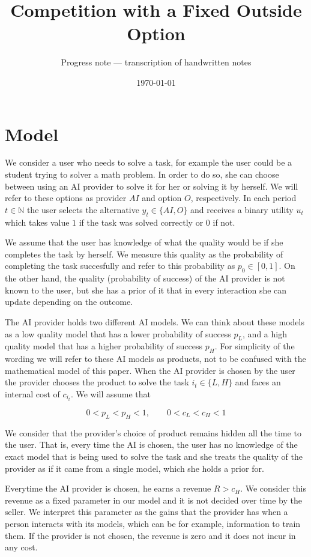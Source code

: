 \documentclass[11pt]{article}
\title{Competition with a Fixed Outside Option}
\author{Progress note --- transcription of handwritten notes}
\date{\today}
\begin{document}
\section{Model}
We consider a user who needs to solve a task, for example the user could be a student trying to solver a math problem. In order to do so, she can choose between using an AI provider to solve it for her or solving it by herself. We will refer to these options as provider $AI$ and option $O$, respectively. In each period $t \in \mathbb{N}$ the user selects the alternative $y_t \in \{AI, O\}$ and receives a binary utility $u_t$ which takes value $1$ if the task was solved correctly or $0$ if not. 

We assume that the user has knowledge of what the quality would be if she completes the task by herself. We measure this quality as the probability of completing the task succesfully and refer to this probability as $p_0\in [0,1]$. On the other hand, the quality (probability of success) of the AI provider is not known to the user, but she has a prior of it that in every interaction she can update depending on the outcome. 

The AI provider holds two different AI models. We can think about these models as a low quality model that has a lower probability of success $p_L$, and a high quality model that has a higher probability of success $p_H$. For simplicity of the wording we will refer to these AI models as products, not to be confused with the mathematical model of this paper. When the AI provider is chosen by the user the provider chooses the product to solve the task $i_t \in \{L,H\}$ and faces an internal cost of $c_{i_t}$. We will assume that 

$$
0<p_L<p_H<1, \qquad 0<c_L<c_H<1 
$$

We consider that the provider's choice of product remains hidden all the time to the user. That is, every time the AI is chosen, the user has no knowledge of the exact model that is being used to solve the task and she treats the quality of the provider as if it came from a single model, which she holds a prior for.  

Everytime the AI provider is chosen, he earns a revenue $R>c_H$. We consider this revenue as a fixed parameter in our model and it is not decided over time by the seller. We interpret this parameter as the   
gains that the provider has when a person interacts with its models, which can be for example, information to train them. If the provider is not chosen, the revenue is zero and it does not incur in any cost. 
 
\end{document}
